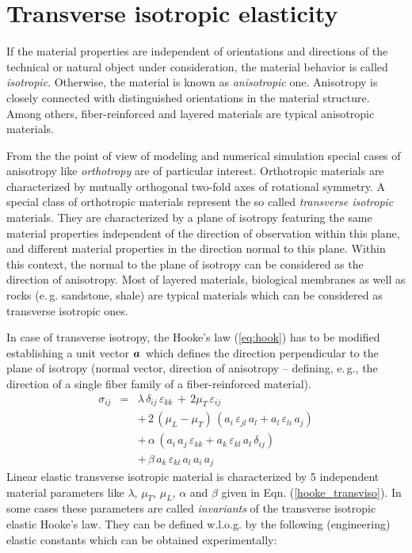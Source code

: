 \section{Transverse isotropic elasticity}

If the material properties are independent of orientations and directions of the technical or natural object under consideration, the material behavior is called {\sl isotropic}. Otherwise, the material is known as {\sl anisotropic} one. Anisotropy is closely connected with distinguished orientations in the material structure. Among others, fiber-reinforced and layered materials are typical anisotropic materials.

From the the point of view of modeling and numerical simulation special cases of anisotropy like {\sl orthotropy} are of particular interest. Orthotropic materials are characterized by mutually orthogonal two-fold axes of rotational symmetry. A special class of orthotropic materials represent the so called {\sl transverse isotropic} materials. They are characterized by a plane of isotropy featuring the same material properties independent of the direction of observation within this plane, and different material properties in the direction normal to this plane. Within this context, the normal to the plane of isotropy can be considered as the direction of anisotropy. Most of layered materials, biological membranes as well as rocks (e.\,g. sandstone, shale) are typical materials which can be considered as transverse isotropic ones.

In case of transverse isotropy, the Hooke's law (\ref{eq:hook}) has to be modified establishing a unit vector $\mbox{${\mbox{\boldmath${a}$\unboldmath}}_{\:\!}$}$ which defines the direction perpendicular to the plane of isotropy (normal vector, direction of anisotropy -- defining, e.\,g., the direction of a single fiber family of a fiber-reinforced material).
\begin{eqnarray}
\sigma_{ij}& = & \lambda\,\delta_{ij}\,\varepsilon_{kk}\,+\,2\mu_T\,\varepsilon_{ij} \nonumber \\[1.50ex]
 &  & +\,2\,\left(\mu_L-\mu_T\right)\,\left(a_i\,\varepsilon_{jl}\,a_l+a_l\,\varepsilon_{li}\,a_j\right) 
 \nonumber \\[1.50ex]
 &  & +\,\alpha\,\left(a_i\,a_j\,\varepsilon_{kk}+a_k\,\varepsilon_{kl}\,a_l\,\delta_{ij}\right) 
 \nonumber \\[1.50ex]
 &  & +\,\beta\,a_k\,\varepsilon_{kl}\,a_l\,a_i\,a_j
\label{hooke_transviso}
\end{eqnarray}
Linear elastic transverse isotropic material is characterized by 5 independent material parameters like $\lambda$, $\mu_T$, $\mu_L$, $\alpha$ and $\beta$ given in Eqn. (\ref{hooke_transviso}). In some cases these parameters are called {\sl invariants} of the transverse isotropic elastic Hooke's law. They can be defined w.l.o.g. by the following (engineering) elastic constants which can be obtained experimentally: 

